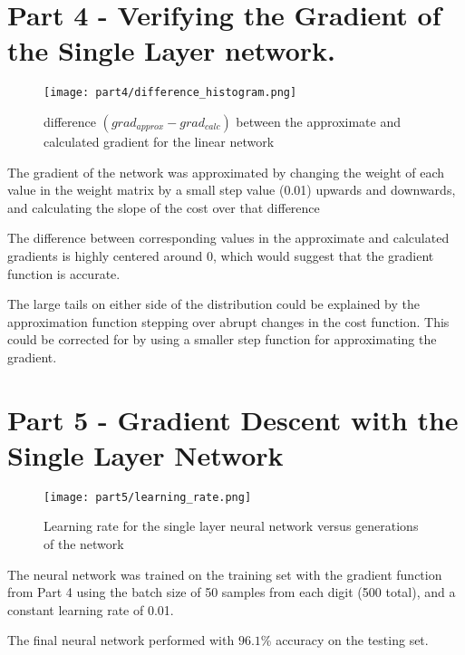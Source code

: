 \documentclass[]{article}
\begin{document}
\clearpage
\newpage

\section{Part 4 - Verifying the Gradient of the Single Layer
 network.}\label{part-4---verifying-the-gradient-of-the-single-layer-network.}

\begin{wrapfigure}[13]{r}{0.5\textwidth}
	\vspace{-20pt}
	\centering
	\texttt{[image: part4/difference\_histogram.png]}
	\caption{ difference $(grad_{approx} - grad_{calc})$ between the approximate and calculated gradient for the linear network}
\end{wrapfigure}

The gradient of the network was approximated by changing the weight of
each value in the weight matrix by a small step value (0.01) upwards and
downwards, and calculating the slope of the cost over that difference

The difference between corresponding values in the approximate and
calculated gradients is highly centered around 0, which would suggest
that the gradient function is accurate.

The large tails on either side of the distribution could be explained by
the approximation function stepping over abrupt changes in the cost
function. This could be corrected for by using a smaller step function
for approximating the gradient.

\section{Part 5 - Gradient Descent with the Single Layer
 Network}\label{part-5---gradient-descent-with-the-single-layer-network}

\begin{figure}[!h]
	\vspace{-20pt}
	\centering
	\texttt{[image: part5/learning\_rate.png]}
	\caption{Learning rate for the single layer neural network versus generations of the network}
\end{figure}

The neural network was trained on the training set with the gradient
function from Part 4 using the batch size of 50 samples from each digit
(500 total), and a constant learning rate of 0.01.

The final neural network performed with \(96.1\)\% accuracy on the
testing set.
\end{document}
